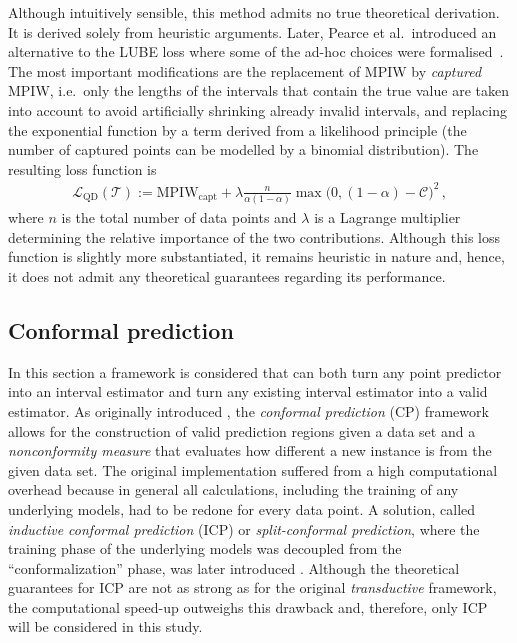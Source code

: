 \documentclass[smallcondensed]{svjour3}
\begin{document}
    Although intuitively sensible, this method admits no true theoretical derivation. It is derived solely from heuristic arguments. Later, Pearce et al.\ introduced an alternative to the LUBE loss where some of the ad-hoc choices were formalised~\cite{pearce2018high}. The most important modifications are the replacement of MPIW by \textit{captured} MPIW, i.e.\ only the lengths of the intervals that contain the true value are taken into account to avoid artificially shrinking already invalid intervals, and replacing the exponential function by a term derived from a likelihood principle (the number of captured points can be modelled by a binomial distribution). The resulting loss function is
    \begin{gather}
        \mathcal{L}_\mathrm{QD}(\mathcal{T}) := \mathrm{MPIW}_\mathrm{capt} + \lambda\frac{n}{\alpha(1-\alpha)}\max\big(0, (1-\alpha) - \mathcal{C}\big)^2\,,
    \end{gather}
    where $n$ is the total number of data points and $\lambda$ is a Lagrange multiplier determining the relative importance of the two contributions. Although this loss function is slightly more substantiated, it remains heuristic in nature and, hence, it does not admit any theoretical guarantees regarding its performance.

\subsection{Conformal prediction}\label{section:cp}

    In this section a framework is considered that can both turn any point predictor into an interval estimator and turn any existing interval estimator into a valid estimator. As originally introduced \cite{vapnik,saunders1999transduction,vovk1999machine}, the \textit{conformal prediction} (CP) framework allows for the construction of valid prediction regions given a data set and a \textit{nonconformity measure} that evaluates how different a new instance is from the given data set. The original implementation suffered from a high computational overhead because in general all calculations, including the training of any underlying models, had to be redone for every data point. A solution, called \textit{inductive conformal prediction} (ICP) or \textit{split-conformal prediction}, where the training phase of the underlying models was decoupled from the ``conformalization'' phase, was later introduced \cite{papadopoulos2002inductive,icp}. Although the theoretical guarantees for ICP are not as strong as for the original \textit{transductive} framework, the computational speed-up outweighs this drawback and, therefore, only ICP will be considered in this study.
\end{document}

